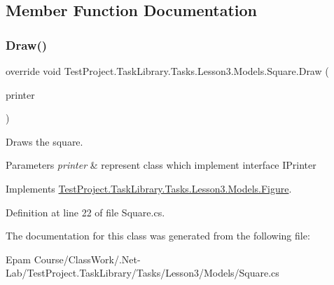 \subsection{Member Function Documentation}
\mbox{\label{class_test_project_1_1_task_library_1_1_tasks_1_1_lesson3_1_1_models_1_1_square_a7dc600c3d04a796aeddfa93477422de7}} 
\subsubsection{\texorpdfstring{Draw()}{Draw()}}
{\footnotesize\ttfamily override void Test\+Project.\+Task\+Library.\+Tasks.\+Lesson3.\+Models.\+Square.\+Draw (\begin{DoxyParamCaption}\item[{I\+Printer}]{printer }\end{DoxyParamCaption})\hspace{0.3cm}{\ttfamily [virtual]}}



Draws the square. 


\begin{DoxyParams}{Parameters}
{\em printer} & represent class which implement interface I\+Printer\\
\hline
\end{DoxyParams}


Implements \mbox{\hyperlink{class_test_project_1_1_task_library_1_1_tasks_1_1_lesson3_1_1_models_1_1_figure_ab736419f3c4dbf51aa758b3d38c10e88}{Test\+Project.\+Task\+Library.\+Tasks.\+Lesson3.\+Models.\+Figure}}.



Definition at line 22 of file Square.\+cs.



The documentation for this class was generated from the following file\+:\begin{DoxyCompactItemize}
\item 
Epam Course/\+Class\+Work/.\+Net-\/\+Lab/\+Test\+Project.\+Task\+Library/\+Tasks/\+Lesson3/\+Models/Square.\+cs\end{DoxyCompactItemize}
